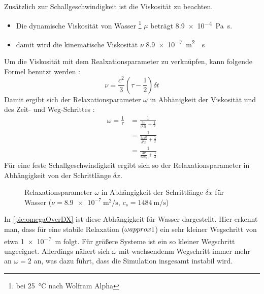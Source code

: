 \documentclass[a4paper,10pt]{scrreprt}
\begin{document}
Zusätzlich zur Schallgeschwindigkeit ist die Viskosität zu beachten.
\begin{itemize}
 \item Die dynamische Viskosität von Wasser \footnote{bei \SI{25}{\celsius} nach Wolfram Alpha} $\mu$ beträgt \SI{8.9e-4}{\pascal \second}. 
 \item damit wird die kinematische Viskosität $\nu$ \SI{8.9e-7}{\metre^2 \per \second}
\end{itemize}
Um die Viskosität mit dem Realxationsparameter zu verknüpfen, kann folgende Formel benutzt werden \cite{Liu2012}:
\begin{equation}
\label{eq:LB-viscosity}
 \nu = \frac{c^2}{3} \left( \tau - \frac{1}{2} \right) \delta t
\end{equation}
Damit ergibt sich der Relaxationsparameter $\omega$ in Abhänigkeit der Viskosität und des Zeit- und Weg-Schrittes :
\begin{align}
 \omega = \frac{1}{\tau} &= \frac{1}{ \frac{3 \nu}{c^2 \delta t} + \frac{1}{2} } \\
  &= \frac{1}{ \frac{3 \nu \delta t}{\delta^2 x} + \frac{1}{2} } \\
  &= \frac{1}{ \frac{3 \nu}{\delta x c_s} + \frac{1}{2} }
\end{align}
Für eine feste Schallgeschwindigkeit ergibt sich so der Relaxationsparameter in Abhängigkeit von der Schrittlänge $\delta x$. 
\begin{figure}
 \centering
{}
\caption{Relaxationsparameter $\omega$ in Abhängigkeit der Schrittlänge $\delta x$ für Wasser ($\nu = \SI{8.9e-7}{\metre^2 \per \second} $, $c_s = \SI{1484}{\metre \per \second}$)}
\label{pic:omegaOverDX}
\end{figure} 
In \autoref{pic:omegaOverDX} ist diese Abhängigkeit für Wasser dargestellt. 
Hier erkennt man, dass für eine stabile Relaxation ($\omega \\approx 1$) ein sehr kleiner Wegschritt von etwa \SI{1e-7}{\metre} folgt. 
Für größere Systeme ist ein so kleiner Wegschritt ungeeignet. 
Allerdings nähert sich $\omega$ mit wachsendenm Wegschritt immer mehr an $\omega = 2$ an, was dazu führt, dass die Simulation insgesamt instabil wird.
\end{document}
